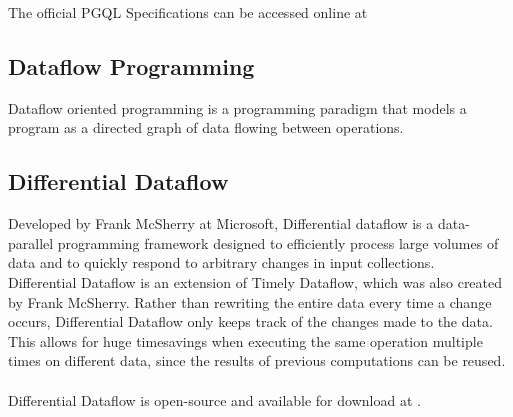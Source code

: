 \documentclass[11pt,singlecolumn]{scrartcl}
\begin{document}
\noindent The official PGQL Specifications can be accessed online at \cite{PGQLSpec}

\subsection{Dataflow Programming}
Dataflow oriented programming is a programming paradigm that models a program as a directed graph of data flowing between operations. 


\subsection{Differential Dataflow}

Developed by Frank McSherry at Microsoft, Differential dataflow is a data-parallel programming framework designed to efficiently process large volumes of data and to quickly respond to arbitrary changes in input collections.\cite{Differential}\\
Differential Dataflow is an extension of Timely Dataflow, which was also created by Frank McSherry. \cite{GitTimely}
Rather than rewriting the entire data every time a change occurs, Differential Dataflow only keeps track of the changes made to the data. This allows for huge timesavings when executing the same operation multiple times on different data, since the results of previous computations can be reused.\\\\
Differential Dataflow is open-source and available for download at \cite{GitDiff}.
\end{document}
